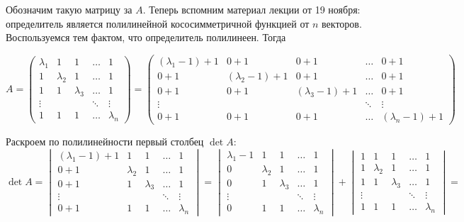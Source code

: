 \documentclass[]{book}
\theoremstyle{definition}
\begin{document}
\begin{enumerate}[resume]
Обозначим такую матрицу за $A$. Теперь вспомним материал лекции от 19 ноября: определитель является полилинейной кососимметричной функцией от $n$ векторов. Воспользуемся тем фактом, что определитель полилинеен. Тогда


$$
A = \begin{pmatrix}
\lambda_1 & 1          & 1          & \dots  & 1 \\
1         & \lambda_2  & 1          & \dots  & 1 \\
1         & 1          & \lambda_3  & \dots  & 1 \\
\vdots    &            &            & \ddots & \vdots \\
1         & 1          & 1          & \dots  & \lambda_n
\end{pmatrix} = 
\begin{pmatrix}
(\lambda_1 - 1) + 1 & 0 + 1          & 0 + 1          & \dots  & 0 + 1 \\
0 + 1         & (\lambda_2 - 1) + 1  & 0 + 1          & \dots  & 0 + 1 \\
0 + 1         & 0 + 1          & (\lambda_3-1) + 1  & \dots  & 0 + 1 \\
\vdots    &            &            & \ddots & \vdots \\
0 + 1         & 0 + 1          & 0 + 1          & \dots  & (\lambda_n - 1) + 1
\end{pmatrix}
$$

Раскроем по полилинейности первый столбец $\det A$:
$$
\det A = 
\begin{vmatrix}
(\lambda_1 - 1) + 1 &  1          & 1          & \dots  & 1 \\
0 + 1          & \lambda_2   &  1          & \dots  & 1 \\
0 + 1      &  1          & \lambda_3 & \dots  & 1 \\
\vdots    &            &            & \ddots & \vdots \\
0 + 1         & 1          & 1          & \dots  & \lambda_n 
\end{vmatrix} =
\begin{vmatrix}
\lambda_1 - 1 & 1          & 1          & \dots  & 1 \\
0         & \lambda_2  & 1          & \dots  & 1 \\
0         & 1          & \lambda_3  & \dots  & 1 \\
\vdots    &            &            & \ddots & \vdots \\
0         & 1          & 1          & \dots  & \lambda_n
\end{vmatrix} + 
\begin{vmatrix}
1 & 1          & 1          & \dots  & 1 \\
1         & \lambda_2  & 1          & \dots  & 1 \\
1         & 1          & \lambda_3  & \dots  & 1 \\
\vdots    &            &            & \ddots & \vdots \\
1        & 1          & 1          & \dots  & \lambda_n
\end{vmatrix} = 
$$


\end{enumerate}
\end{document}
